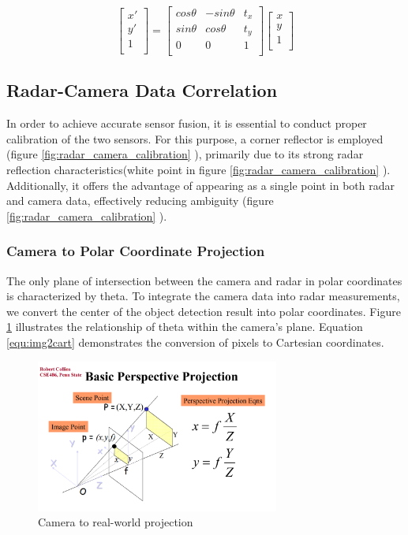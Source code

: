 \begin{equation}\label{equ:2d_trans_eq}
    \begin{bmatrix}
        x'\\ 
        y'\\
        1\\
    \end{bmatrix}=
    \begin{bmatrix}
    cos\theta & -sin\theta & t_x\\
    sin\theta & cos\theta & t_y\\
    0 & 0 & 1\\
    \end{bmatrix}
    \begin{bmatrix}
        x\\ 
        y\\
        1\\
    \end{bmatrix}
\end{equation}

\newpage
\subsection{Radar-Camera Data Correlation}
In order to achieve accurate sensor fusion, it is essential to conduct proper calibration of the two sensors. 
For this purpose, a corner reflector is employed (figure \ref*{fig:radar_camera_calibration} ), primarily due to its strong radar reflection characteristics(white point in figure \ref*{fig:radar_camera_calibration} ). 
Additionally, it offers the advantage of appearing as a single point in both radar and camera data, effectively reducing ambiguity (figure \ref*{fig:radar_camera_calibration} ).
\subsubsection{Camera to Polar Coordinate Projection}
The only plane of intersection between the camera and radar in polar coordinates is characterized by theta. 
To integrate the camera data into radar measurements, 
we convert the center of the object detection result into polar coordinates. 
Figure \ref{fig:camera_projection} illustrates the relationship of theta within the camera's plane. 
Equation \ref{equ:img2cart} demonstrates the conversion of pixels to Cartesian coordinates.
\begin{figure}[hpbt]
    \centering
    \includegraphics[width=8cm]{Figures/cam_projection.png}%
    \caption{Camera to real-world projection}
    \label{fig:camera_projection}
\end{figure}

